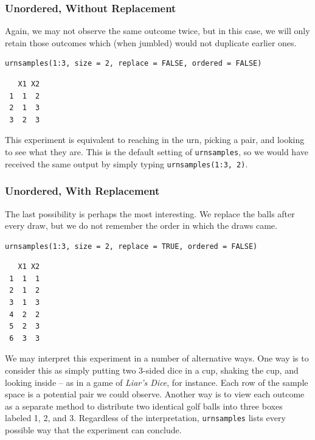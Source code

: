 \documentclass[captions=tableheading]{scrbook}
\begin{document}
\begin{example}
\subsubsection{Unordered, Without Replacement}
\label{sec-4-1-2-4}


Again, we may not observe the same outcome twice, but in this case, we will only retain those outcomes which (when jumbled) would not duplicate earlier ones. 


\lstset{language=R}
\begin{lstlisting}
urnsamples(1:3, size = 2, replace = FALSE, ordered = FALSE)
\end{lstlisting}

\begin{verbatim}
   X1 X2
 1  1  2
 2  1  3
 3  2  3
\end{verbatim}

This experiment is equivalent to reaching in the urn, picking a pair, and looking to see what they are. This is the default setting of \texttt{urnsamples}, so we would have received the same output by simply typing \texttt{urnsamples(1:3, 2)}.
\subsubsection{Unordered, With Replacement}
\label{sec-4-1-2-5}


The last possibility is perhaps the most interesting. We replace the balls after every draw, but we do not remember the order in which the draws came. 


\lstset{language=R}
\begin{lstlisting}
urnsamples(1:3, size = 2, replace = TRUE, ordered = FALSE)
\end{lstlisting}

\begin{verbatim}
   X1 X2
 1  1  1
 2  1  2
 3  1  3
 4  2  2
 5  2  3
 6  3  3
\end{verbatim}

We may interpret this experiment in a number of alternative ways. One way is to consider this as simply putting two 3-sided dice in a cup, shaking the cup, and looking inside -- as in a game of \emph{Liar's Dice}, for instance. Each row of the sample space is a potential pair we could observe. Another way is to view each outcome as a separate method to distribute two identical golf balls into three boxes labeled 1, 2, and 3. Regardless of the interpretation, \texttt{urnsamples} lists every possible way that the experiment can conclude.

\end{example}
\end{document}
